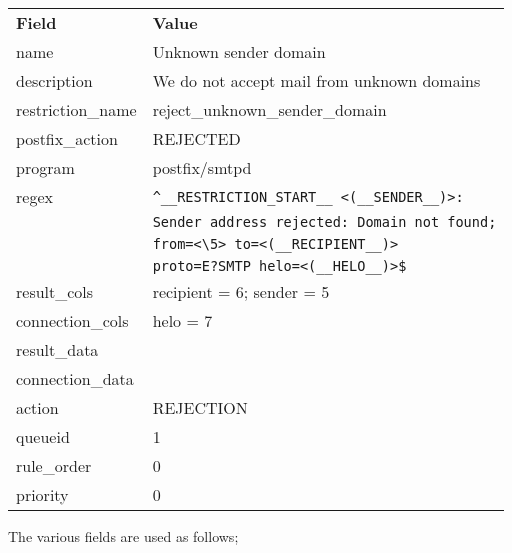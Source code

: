 \documentclass[a4paper,12pt,draft]{article}
\begin{document}
\begin{tabular}[]{ll}

\textbf{Field}      & \textbf{Value}                                    \\
name                & Unknown sender domain                             \\
description         & We do not accept mail from unknown domains        \\
restriction\_name   & reject\_unknown\_sender\_domain                   \\
postfix\_action     & REJECTED                                          \\
program             & postfix/smtpd                                     \\
regex               & \verb!^__RESTRICTION_START__ <(__SENDER__)>: !    \\
                    & \verb!Sender address rejected: Domain not found;! \\
                    & \verb!from=<\5> to=<(__RECIPIENT__)> !            \\
                    & \verb!proto=E?SMTP helo=<(__HELO__)>$!            \\
result\_cols        & recipient = 6; sender = 5                         \\
connection\_cols    & helo = 7                                          \\
result\_data        &                                                   \\
connection\_data    &                                                   \\
action              & REJECTION                                         \\
queueid             & 1                                                 \\
rule\_order         & 0                                                 \\
priority            & 0                                                 \\

\end{tabular}

The various fields are used as follows;
\end{document}
